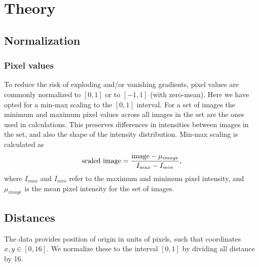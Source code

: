 \section{Theory}
\subsection{Normalization}
\subsubsection{Pixel values}
To reduce the risk of exploding and/or vanishing gradients, pixel values are 
commonly normalized to $[0, 1]$ or to $[-1, 1]$ (with zero-mean). 
Here we have opted for a min-max scaling to the $[0, 1]$ interval.
For a set of images the minimum and maximum pixel values across all images
in the set are the ones used in calculations. This preserves differences in
intensities between images in the set, and also the shape of the intensity 
distribution. Min-max scaling is calculated as
\begin{equation}
    \text{scaled image} = \frac{\text{image} - \mu_{image}}{I_{max} - I_{min}},
\end{equation}
where $I_{max}$ and $I_{min}$ refer to the maximum and minimum pixel intensity,
and $\mu_{image}$ is the mean pixel intensity for the set of images.

\subsection{Distances}
The data provides position of origin in units of pixels, such that coordinates
$x,y \in [0,16]$. We normalize these to the interval $[0,1]$ by dividing all
distance by 16.
